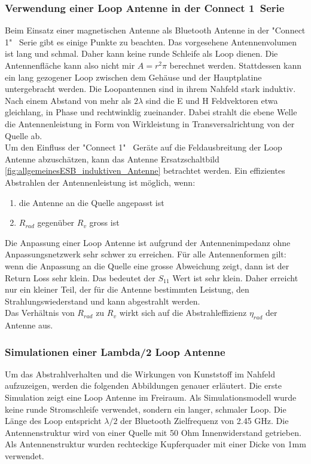 \subsubsection{Verwendung einer Loop Antenne in der \glqq Connect 1\grqq \  Serie}
Beim Einsatz einer magnetischen Antenne als Bluetooth Antenne in der "Connect 1"  \ Serie gibt es einige Punkte zu beachten. Das vorgesehene Antennenvolumen ist lang und schmal. Daher kann keine runde Schleife als Loop dienen. Die Antennenfläche kann also nicht mir $A=r^{2}\pi$ berechnet werden. Stattdessen  kann ein lang gezogener Loop zwischen dem Gehäuse und der Hauptplatine untergebracht werden. Die Loopantennen sind in ihrem Nahfeld stark induktiv. Nach einem Abstand von mehr als $2\lambda$ sind die E und H Feldvektoren etwa gleichlang, in Phase und rechtwinklig zueinander. Dabei strahlt die  ebene Welle  die Antennenleistung in Form von Wirkleistung in Transversalrichtung von der Quelle ab.\\
Um den Einfluss der "Connect 1" \ Geräte auf die Feldausbreitung der Loop Antenne abzuschätzen, kann das Antenne Ersatzschaltbild \ref{fig:allgemeinesESB_induktiven_Antenne}  betrachtet werden. Ein effizientes Abstrahlen der Antennenleistung ist möglich, wenn:
  \begin{enumerate}[label={\alph*)}] 
     \item die Antenne an die Quelle angepasst ist 
     \item $R_{rad}$ gegenüber $R_{v}$ gross ist 
  \end{enumerate} 
Die Anpassung einer Loop Antenne ist aufgrund der Antennenimpedanz ohne Anpassungsnetzwerk sehr schwer zu erreichen. Für alle Antennenformen gilt: wenn die Anpassung an die Quelle eine grosse Abweichung zeigt, dann ist der Return Loss sehr klein. Das bedeutet der $S_{11}$ Wert ist sehr klein. Daher erreicht nur ein kleiner Teil, der für die Antenne bestimmten Leistung, den Strahlungswiederstand und kann abgestrahlt werden.\\
Das Verhältnis von $R_{rad}$ zu $R_{v}$ wirkt sich auf die Abstrahleffizienz $\eta_{rad}$ der Antenne aus. 



\subsubsection{Simulationen einer Lambda/2 Loop Antenne}\label{sec:SimL2Loop}
Um das Abstrahlverhalten und die Wirkungen von Kunststoff im Nahfeld aufzuzeigen, werden die folgenden Abbildungen genauer erläutert.
Die erste Simulation zeigt eine Loop Antenne im Freiraum. Als Simulationsmodell wurde keine runde Stromschleife verwendet, sondern ein langer, schmaler Loop. Die Länge des Loop entspricht $\lambda/2$ der Bluetooth Zielfrequenz von 2.45 GHz. Die Antennenstruktur wird von einer Quelle mit 50 Ohm Innenwiderstand getrieben. Als Antennenstruktur wurden  rechteckige Kupferquader mit einer Dicke von 1mm verwendet.\\


